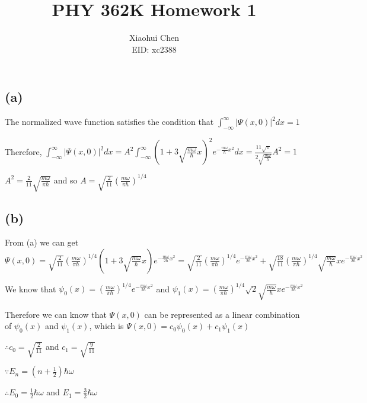 \documentclass[12pt]{article}
\author{Xiaohui Chen \\EID: xc2388}
\title{PHY 362K Homework 1}
\begin{document}
\maketitle
\begin{spacing}{2.0}

\section{} %
\subsection*{(a)}
The normalized wave function satisfies the condition that $\int_{-\infty}^{\infty} |\Psi(x,0)|^2 dx =1$

Therefore, $\int_{-\infty}^{\infty} |\Psi(x,0)|^2 dx = A^2 \int_{-\infty}^{\infty} \left( 1+3 \sqrt{\frac{m\omega}{\hbar}}x\right)^2 e^{-\frac{m\omega}{\hbar} x^2} dx= \frac{11 \sqrt{\pi }}{2 \sqrt{\frac{m \omega }{\hbar }}} A^2 =1$

$A^2=\frac{2}{11}\sqrt{\frac{m\omega}{\pi \hbar}}$ and so $A=\sqrt{\frac{2}{11}}\left(\frac{m\omega}{\pi \hbar} \right)^{1/4}$

\subsection*{(b)}
From (a) we can get $\Psi(x,0)= \sqrt{\frac{2}{11}}\left(\frac{m\omega}{\pi \hbar} \right)^{1/4} \left( 1+3 \sqrt{\frac{m\omega}{\hbar}}x\right) e^{-\frac{m\omega}{2\hbar} x^2}= \sqrt{\frac{2}{11}}\left(\frac{m\omega}{\pi \hbar} \right)^{1/4} e^{-\frac{m\omega}{2\hbar} x^2} +\sqrt{\frac{18}{11}}\left(\frac{m\omega}{\pi \hbar} \right)^{1/4} \sqrt{\frac{m\omega}{\hbar}}x e^{-\frac{m\omega}{2\hbar} x^2}$

We know that $\psi_0(x)=\left(\frac{m\omega}{\pi \hbar} \right)^{1/4} e^{-\frac{m\omega}{2\hbar} x^2}$ and $\psi_1(x)= \left(\frac{m\omega}{\pi \hbar} \right)^{1/4} \sqrt{2} \sqrt{\frac{m\omega}{\hbar}} x e^{-\frac{m\omega}{2\hbar} x^2}$

Therefore we can know that $\Psi(x,0)$ can be represented as a linear combination of $\psi_0(x)$ and $\psi_1(x)$, which is $\Psi(x,0)= c_0\psi_0(x) + c_1\psi_1(x)$

$\therefore c_0=\sqrt{\frac{2}{11}}$ and $c_1=\sqrt{\frac{9}{11}}$

$\because E_n=\left( n+\frac{1}{2} \right)\hbar\omega$

$\therefore E_0=\frac{1}{2}\hbar\omega$ and $E_1=\frac{3}{2}\hbar\omega$


\end{spacing}
\end{document}
